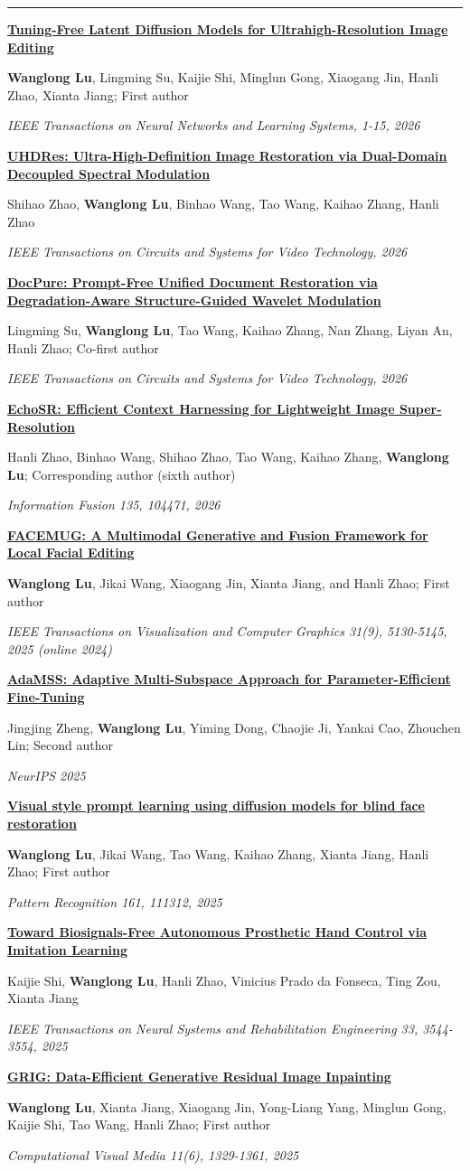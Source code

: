 \documentclass[11pt,letterpaper]{article}
\newcommand{\cvsection}[1]{\par\addvspace{6pt}{\large\bfseries #1}\par\vspace{1pt}\hrule\vspace{3pt}}
\newcommand{\pubitem}[4]{\par\addvspace{6pt}\begin{minipage}{\linewidth}\href{#4}{\textbf{#1}}\par{\small #2}\par{\small\textit{#3}}\end{minipage}\par}
\begin{document}
\newpage
\cvsection{Peer-Reviewed Publications}
\pubitem{Tuning-Free Latent Diffusion Models for Ultrahigh-Resolution Image Editing}{\textbf{Wanglong Lu}, Lingming Su, Kaijie Shi, Minglun Gong, Xiaogang Jin, Hanli Zhao, Xianta Jiang; First author}{IEEE Transactions on Neural Networks and Learning Systems, 1-15, 2026}{https://doi.org/10.1109/TNNLS.2026.3707463}
\pubitem{UHDRes: Ultra-High-Definition Image Restoration via Dual-Domain Decoupled Spectral Modulation}{Shihao Zhao, \textbf{Wanglong Lu}, Binhao Wang, Tao Wang, Kaihao Zhang, Hanli Zhao}{IEEE Transactions on Circuits and Systems for Video Technology, 2026}{https://arxiv.org/abs/2511.05009}
\pubitem{DocPure: Prompt-Free Unified Document Restoration via Degradation-Aware Structure-Guided Wavelet Modulation}{Lingming Su, \textbf{Wanglong Lu}, Tao Wang, Kaihao Zhang, Nan Zhang, Liyan An, Hanli Zhao; Co-first author}{IEEE Transactions on Circuits and Systems for Video Technology, 2026}{https://doi.org/10.1109/TCSVT.2026.3720433}
\pubitem{EchoSR: Efficient Context Harnessing for Lightweight Image Super-Resolution}{Hanli Zhao, Binhao Wang, Shihao Zhao, Tao Wang, Kaihao Zhang, \textbf{Wanglong Lu}; Corresponding author (sixth author)}{Information Fusion 135, 104471, 2026}{https://doi.org/10.1016/j.inffus.2026.104471}
\pubitem{FACEMUG: A Multimodal Generative and Fusion Framework for Local Facial Editing}{\textbf{Wanglong Lu}, Jikai Wang, Xiaogang Jin, Xianta Jiang, and Hanli Zhao; First author}{IEEE Transactions on Visualization and Computer Graphics 31(9), 5130-5145, 2025 (online 2024)}{https://doi.org/10.1109/TVCG.2024.3434386}
\pubitem{AdaMSS: Adaptive Multi-Subspace Approach for Parameter-Efficient Fine-Tuning}{Jingjing Zheng, \textbf{Wanglong Lu}, Yiming Dong, Chaojie Ji, Yankai Cao, Zhouchen Lin; Second author}{NeurIPS 2025}{https://doi.org/10.52202/085713-0664}
\pubitem{Visual style prompt learning using diffusion models for blind face restoration}{\textbf{Wanglong Lu}, Jikai Wang, Tao Wang, Kaihao Zhang, Xianta Jiang, Hanli Zhao; First author}{Pattern Recognition 161, 111312, 2025}{https://doi.org/10.1016/j.patcog.2024.111312}
\pubitem{Toward Biosignals-Free Autonomous Prosthetic Hand Control via Imitation Learning}{Kaijie Shi, \textbf{Wanglong Lu}, Hanli Zhao, Vinicius Prado da Fonseca, Ting Zou, Xianta Jiang}{IEEE Transactions on Neural Systems and Rehabilitation Engineering 33, 3544-3554, 2025}{https://doi.org/10.1109/TNSRE.2025.3605579}
\pubitem{GRIG: Data-Efficient Generative Residual Image Inpainting}{\textbf{Wanglong Lu}, Xianta Jiang, Xiaogang Jin, Yong-Liang Yang, Minglun Gong, Kaijie Shi, Tao Wang, Hanli Zhao; First author}{Computational Visual Media 11(6), 1329-1361, 2025}{https://doi.org/10.26599/CVM.2025.9450408}
\end{document}
